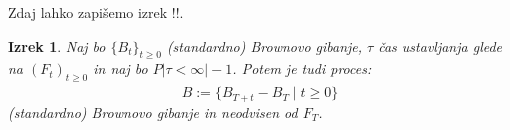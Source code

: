 \documentclass[11pt]{article}
\theoremstyle{plain}
\newtheorem{izrek}{Izrek}[section]
\theoremstyle{definition}
\begin{document}
    Zdaj lahko zapišemo izrek !!. %
    
    
    \begin{izrek}
        Naj bo $\{B_t\}_{t \geq 0}$ (standardno) Brownovo gibanje, $\tau$ čas ustavljanja glede na 
        ${(F_{t})}_{{t}\ge{0}}$ in naj bo $P|\tau<\infty|-1$.
        Potem je tudi proces:
        \[
        \hat{B} := \{B_{T+t} - B_T \mid t \geq 0\}
        \]
        (standardno) Brownovo gibanje in neodvisen od ${F}_{T}$.
    \end{izrek}

    
\end{document}
